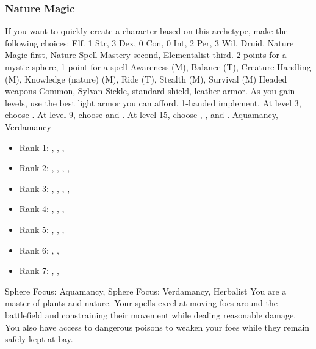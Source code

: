         \subsubsection{Nature Magic}
            If you want to quickly create a character based on this archetype, make the following choices:
             Elf.
             1 Str, 3 Dex, 0 Con, 0 Int, 2 Per, 3 Wil.
             Druid.
             Nature Magic first, Nature Spell Mastery second, Elementalist third.
             2 points for a mystic sphere, 1 point for a spell
             Awareness (M), Balance (T), Creature Handling (M), Knowledge (nature) (M), Ride (T), Stealth (M), Survival (M)
             Headed weapons
             Common, Sylvan
             Sickle, standard shield, leather armor. As you gain levels, use the best light armor you can afford.
             1-handed implement.
                At level 3, choose .
                At level 9, choose  and .
                At level 15, choose , , and .
             Aquamancy, Verdamancy
            \begin{itemize}
                \item Rank 1: , , , 
                \item Rank 2: , , , , 
                \item Rank 3: , , , , 
                \item Rank 4: , , , 
                \item Rank 5: , , , 
                \item Rank 6: , , 
                \item Rank 7: , , 
            \end{itemize}
             Sphere Focus: Aquamancy, Sphere Focus: Verdamancy, Herbalist
             You are a master of plants and nature.
            Your spells excel at moving foes around the battlefield and constraining their movement while dealing reasonable damage.
            You also have access to dangerous poisons to weaken your foes while they remain safely kept at bay.

